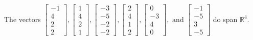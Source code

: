 \begin{exercise}
\begin{exerciseStatement}
  \end{exerciseStatement}
  \begin{exerciseAnswer}
   The vectors \(\left[\begin{array}{r}
-1 \\
4 \\
2 \\
2
\end{array}\right] , \left[\begin{array}{r}
1 \\
4 \\
2 \\
1
\end{array}\right] , \left[\begin{array}{r}
-3 \\
-5 \\
-2 \\
-2
\end{array}\right] , \left[\begin{array}{r}
2 \\
4 \\
1 \\
2
\end{array}\right] , \left[\begin{array}{r}
0 \\
-3 \\
4 \\
0
\end{array}\right] , \text{ and } \left[\begin{array}{r}
-1 \\
-5 \\
3 \\
-5
\end{array}\right]\) 
  	 do  
	span \(\mathbb{R}^4\).
  


  \end{exerciseAnswer}
\end{exercise}